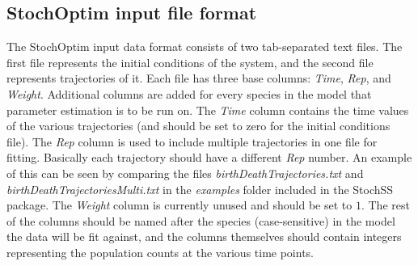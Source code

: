 \subsection{StochOptim input file format}
The StochOptim input data format consists of two tab-separated text files.
The first file represents the initial conditions of the system, and the second file represents trajectories of it.
Each file has three base columns: \textit{Time}, \textit{Rep}, and \textit{Weight}. Additional columns are added for every species in the model that parameter estimation is to be run on. The \textit{Time} column contains the time values of the various trajectories (and should be set to zero for the initial conditions file). The \textit{Rep} column is used to include multiple trajectories in one file for fitting. Basically each trajectory should have a different \textit{Rep} number. An example of this can be seen by comparing the files \textit{birthDeathTrajectories.txt} and \textit{birthDeathTrajectoriesMulti.txt} in the \textit{examples} folder included in the StochSS package. The \textit{Weight} column is currently unused and should be set to $1$. The rest of the columns should be named after the species (case-sensitive) in the model the data will be fit against, and the columns themselves should contain integers representing the population counts at the various time points.

